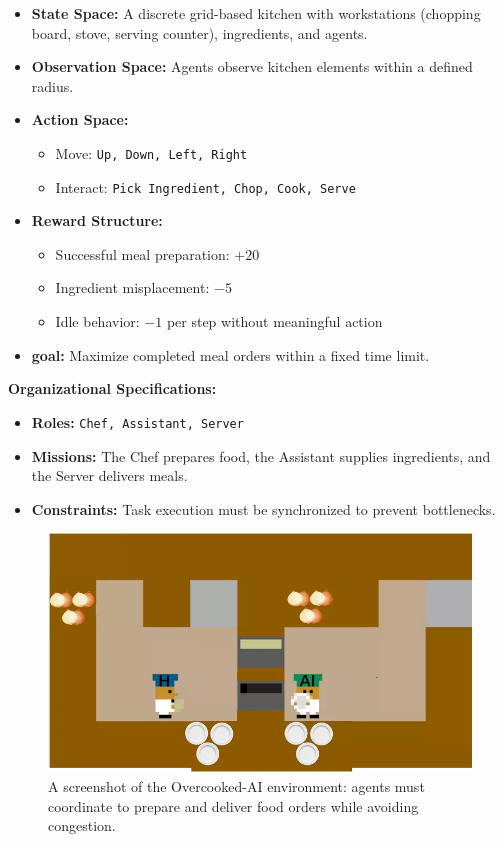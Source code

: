 \documentclass[pdflatex,sn-mathphys-num]{sn-jnl}%
\theoremstyle{thmstyleone}%
\theoremstyle{thmstyletwo}%
\theoremstyle{thmstylethree}%
\begin{document}
\begin{itemize}
    \item \textbf{State Space:} A discrete grid-based kitchen with workstations (chopping board, stove, serving counter), ingredients, and agents.
    \item \textbf{Observation Space:} Agents observe kitchen elements within a defined radius.
    \item \textbf{Action Space:} 
    \begin{itemize}
        \item Move: \texttt{Up, Down, Left, Right}
        \item Interact: \texttt{Pick Ingredient, Chop, Cook, Serve}
    \end{itemize}
    \item \textbf{Reward Structure:}
    \begin{itemize}
        \item Successful meal preparation: $+20$
        \item Ingredient misplacement: $-5$
        \item Idle behavior: $-1$ per step without meaningful action
    \end{itemize}
    \item \textbf{goal:} Maximize completed meal orders within a fixed time limit.
\end{itemize}

\textbf{Organizational Specifications:} 
\begin{itemize}
    \item \textbf{Roles:} \texttt{Chef, Assistant, Server}
    \item \textbf{Missions:} The Chef prepares food, the Assistant supplies ingredients, and the Server delivers meals.
    \item \textbf{Constraints:} Task execution must be synchronized to prevent bottlenecks.
\end{itemize}

\begin{figure}[h!]
    \centering
    \includegraphics[width=0.7\linewidth]{figures/overcooked.png}
    \caption{A screenshot of the Overcooked-AI environment: agents must coordinate to prepare and deliver food orders while avoiding congestion.}
    \label{fig:overcooked}
\end{figure}
\end{document}
